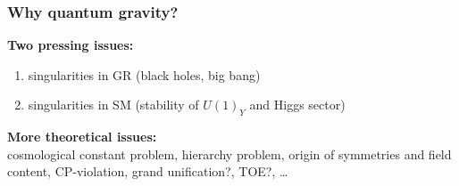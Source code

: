 \documentclass[]{beamer}  %
\begin{document}
\begin{frame}
  \frametitle{Why quantum gravity?}

  \vspace{-7pt}

  \textbf{Two pressing issues:}
  \begin{enumerate}
    \item singularities in GR (black holes, big bang)
      \hspace{2cm}
    \item singularities in SM (stability of $U(1)_Y$ and Higgs sector)
  \end{enumerate}
  \vfill
  \pause
  \textbf{More theoretical issues:}\\[5pt]
  cosmological constant problem, hierarchy problem, origin of symmetries and field content,
  CP-violation, grand unification?, TOE?, \dots
\end{frame}
\end{document}
